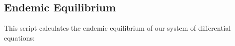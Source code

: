 \documentclass[12pt]{article}
\begin{document}
        \subsection{Endemic Equilibrium}
        \label{appendix:B7}
        This script calculates the endemic equilibrium of our system of differential equations:        
        \begin{center}
            
        \end{center}
\newpage
% 
% 
\printbibliography
\end{document}
